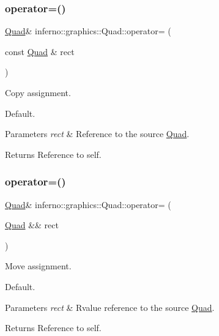 \subsubsection{\texorpdfstring{operator=()}{operator=()}\hspace{0.1cm}{\footnotesize\ttfamily [1/2]}}
{\footnotesize\ttfamily \mbox{\hyperlink{classinferno_1_1graphics_1_1_quad}{Quad}}\& inferno\+::graphics\+::\+Quad\+::operator= (\begin{DoxyParamCaption}\item[{const \mbox{\hyperlink{classinferno_1_1graphics_1_1_quad}{Quad}} \&}]{rect }\end{DoxyParamCaption})\hspace{0.3cm}{\ttfamily [default]}}



Copy assignment. 

Default. 
\begin{DoxyParams}{Parameters}
{\em rect} & Reference to the source \mbox{\hyperlink{classinferno_1_1graphics_1_1_quad}{Quad}}. \\
\hline
\end{DoxyParams}
\begin{DoxyReturn}{Returns}
Reference to self. 
\end{DoxyReturn}
\mbox{\label{classinferno_1_1graphics_1_1_quad_a2061f2390481b6c66187c8c7377e085d}} 
\subsubsection{\texorpdfstring{operator=()}{operator=()}\hspace{0.1cm}{\footnotesize\ttfamily [2/2]}}
{\footnotesize\ttfamily \mbox{\hyperlink{classinferno_1_1graphics_1_1_quad}{Quad}}\& inferno\+::graphics\+::\+Quad\+::operator= (\begin{DoxyParamCaption}\item[{\mbox{\hyperlink{classinferno_1_1graphics_1_1_quad}{Quad}} \&\&}]{rect }\end{DoxyParamCaption})\hspace{0.3cm}{\ttfamily [default]}}



Move assignment. 

Default. 
\begin{DoxyParams}{Parameters}
{\em rect} & Rvalue reference to the source \mbox{\hyperlink{classinferno_1_1graphics_1_1_quad}{Quad}}. \\
\hline
\end{DoxyParams}
\begin{DoxyReturn}{Returns}
Reference to self. 
\end{DoxyReturn}
\mbox{\label{classinferno_1_1graphics_1_1_quad_a7670f2faa1d1b88bb8202d4efa968899}} 
